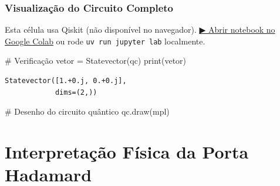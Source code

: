 \documentclass[
  brazilian,
]{report}
\newenvironment{Shaded}{\begin{snugshade}}{\end{snugshade}}
\newcommand{\BuiltInTok}[1]{\textcolor[rgb]{0.00,0.23,0.31}{#1}}
\newcommand{\CommentTok}[1]{\textcolor[rgb]{0.37,0.37,0.37}{#1}}
\newcommand{\NormalTok}[1]{\textcolor[rgb]{0.00,0.23,0.31}{#1}}
\newcommand{\OperatorTok}[1]{\textcolor[rgb]{0.37,0.37,0.37}{#1}}
\begin{document}
\subsection{Visualização do Circuito
Completo}\label{visualizauxe7uxe3o-do-circuito-completo}

\begin{tcolorbox}[enhanced jigsaw, arc=.35mm, bottomrule=.15mm, bottomtitle=1mm, breakable, colback=white, colbacktitle=quarto-callout-warning-color!10!white, colframe=quarto-callout-warning-color-frame, coltitle=black, left=2mm, leftrule=.75mm, opacityback=0, opacitybacktitle=0.6, rightrule=.15mm, title=\textcolor{quarto-callout-warning-color}{\faExclamationTriangle}\hspace{0.5em}{⚛️ Célula Qiskit --- execute no Colab ou localmente}, titlerule=0mm, toprule=.15mm, toptitle=1mm]

Esta célula usa Qiskit (não disponível no navegador).
\href{https://colab.research.google.com/github/maxwellamaral/aula-quantum/blob/main/notebooks/04-Hadamard-experiment.ipynb}{▶
Abrir notebook no Google Colab} ou rode \texttt{uv\ run\ jupyter\ lab}
localmente.

\begin{Shaded}
\begin{Highlighting}[]


\CommentTok{\# Verificação}
\NormalTok{vetor }\OperatorTok{=}\NormalTok{ Statevector(qc)}
\BuiltInTok{print}\NormalTok{(vetor)}
\end{Highlighting}
\end{Shaded}

\end{tcolorbox}

\begin{verbatim}
Statevector([1.+0.j, 0.+0.j],
            dims=(2,))
\end{verbatim}

\begin{Shaded}
\begin{Highlighting}[]

\NormalTok{\# Desenho do circuito quântico}
\NormalTok{qc.draw(\textquotesingle{}mpl\textquotesingle{})}
\end{Highlighting}
\end{Shaded}

\chapter{Interpretação Física da Porta
Hadamard}\label{interpretauxe7uxe3o-fuxedsica-da-porta-hadamard}
\end{document}

